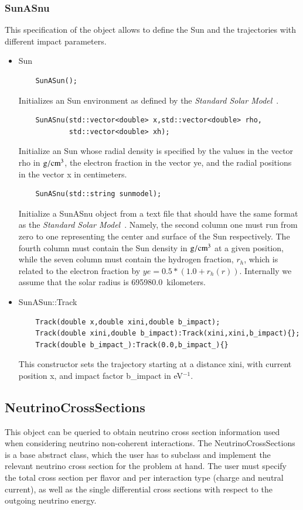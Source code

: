 \documentclass[3p,12pt]{elsarticle}
\newcommand{\ttf}{\ttfamily}
\begin{document}
\subsubsection{{SunASnu}\label{sec:sunasnu}}
This specification of the object allows to define the Sun and the
trajectories with different impact parameters.
\begin{itemize}
\item {\ttf Sun}
  \begin{lstlisting}
    SunASun();
  \end{lstlisting}
  Initializes an {\ttf Sun} environment as defined by the {\it
    Standard Solar Model}~\citep{bahcall2005new}.
  \begin{lstlisting}
    SunASnu(std::vector<double> x,std::vector<double> rho,
            std::vector<double> xh);
  \end{lstlisting}
  Initialize an {\ttf Sun} whose radial density is specified by the
  values in the vector {\ttf rho} in ${\rm g}/{\rm cm}^3$, the
  electron fraction in the vector {\ttf ye}, and the radial positions
  in the vector {\ttf x} in centimeters. 

  \begin{lstlisting}
    SunASnu(std::string sunmodel);
  \end{lstlisting}
  Initialize a {\ttf SunASnu} object from a text file that should have the same format as the {\it
  Standard Solar Model}~\citep{bahcall2005new}. Namely, the second column one must run from zero to one representing
  the center and surface of the Sun respectively. The
  fourth column must contain the Sun density in ${\rm g}/{\rm cm}^3$ at
  a given position, while the seven column must contain
  the hydrogen fraction, $r_h$, which is related to the electron fraction by $ye = 0.5*(1.0+r_h(r))$.
  Internally we assume that the solar radius is 695980.0~kilometers.

\item {\ttf SunASun::Track}
  \begin{lstlisting}
    Track(double x,double xini,double b_impact);
    Track(double xini,double b_impact):Track(xini,xini,b_impact){};
    Track(double b_impact_):Track(0.0,b_impact_){}
  \end{lstlisting}
  This constructor sets the trajectory starting at a distance 
  {\ttf xini}, with current position {\ttf x}, and impact factor {\ttf
    b\_impact} in eV$^{-1}$.
\end{itemize}


\subsection{NeutrinoCrossSections\label{sec:neutrino_cross_section}}
\label{sec:xs}
This object can be queried to obtain neutrino cross section information used when considering neutrino non-coherent interactions. The {\ttf NeutrinoCrossSections} is a base abstract class, which the user has to subclass and implement the relevant neutrino cross section for the problem at hand. The user must specify the total cross section per flavor and per interaction type (charge and neutral current), as well as the single differential cross sections with respect to the outgoing neutrino energy.
\end{document}
